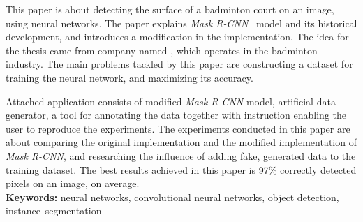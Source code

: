 This paper is about detecting the surface of a badminton court on an image, using neural networks. The paper explains \textit{Mask R-CNN}~\cite{general-mask-rcnn} model and its historical development, and introduces a modification in the implementation. The idea for the thesis came from company named \blue{}, which operates in the badminton industry.
The main problems tackled by this paper are constructing a dataset for training the neural network, and maximizing its accuracy.

Attached application consists of modified \textit{Mask R-CNN} model, artificial data generator, a tool for annotating the data together with instruction enabling the user to reproduce the experiments. The experiments conducted in this paper are about comparing the original implementation and the modified implementation of \textit{Mask R-CNN}, and researching the influence of adding fake, generated data to the training dataset. The best results achieved in this paper is 97\% correctly detected pixels on an image, on average.
\\

\noindent \textbf{Keywords:} neural networks, convolutional neural networks, object detection, instance~segmentation
